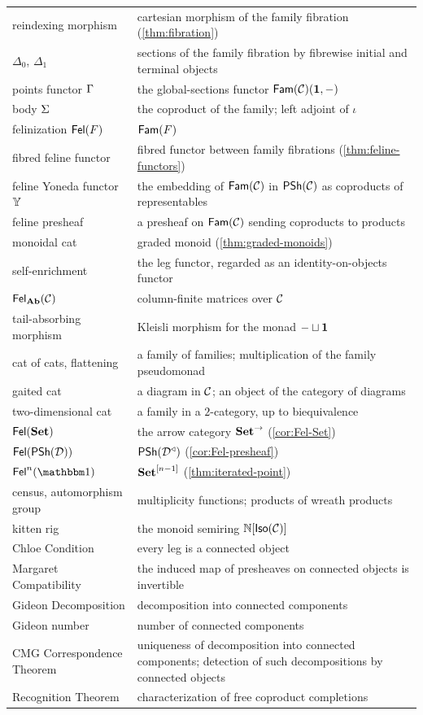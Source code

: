 {\begin{longtable}{p{}p{}}
reindexing morphism & cartesian morphism of the family fibration (\cref{thm:fibration})\\
$\Delta_0$, $\Delta_1$ & sections of the family fibration by fibrewise initial and terminal objects\\
points functor $\Gamma$ & the global-sections functor $\mathsf{Fam}(\mathcal{C})(\mathbf{1},-)$\\
body $\Sigma$ & the coproduct of the family; left adjoint of $\iota$\\
felinization $\mathsf{Fel}(F)$ & $\mathsf{Fam}(F)$\\
fibred feline functor & fibred functor between family fibrations (\cref{thm:feline-functors})\\
feline Yoneda functor $\mathbb{Y}$ & the embedding of $\mathsf{Fam}(\mathcal{C})$ in $\mathsf{PSh}(\mathcal{C})$ as coproducts of representables\\
feline presheaf & a presheaf on $\mathsf{Fam}(\mathcal{C})$ sending coproducts to products\\
monoidal cat & graded monoid (\cref{thm:graded-monoids})\\
self-enrichment & the leg functor, regarded as an identity-on-objects functor\\
$\mathsf{Fel}_{\mathbf{Ab}}(\mathcal{C})$ & column-finite matrices over $\mathcal{C}$\\
tail-absorbing morphism & Kleisli morphism for the monad $-\sqcup\mathbf{1}$\\
cat of cats, flattening & a family of families; multiplication of the family pseudomonad\\
gaited cat & a diagram in $\mathcal{C}$; an object of the category of diagrams\\
two-dimensional cat & a family in a $2$-category, up to biequivalence\\
$\mathsf{Fel}(\mathbf{Set})$ & the arrow category $\mathbf{Set}^{\to}$ (\cref{cor:Fel-Set})\\
$\mathsf{Fel}(\mathsf{PSh}(\mathcal{D}))$ & $\mathsf{PSh}(\mathcal{D}^{\triangleleft})$ (\cref{cor:Fel-presheaf})\\
$\Fel^n(\one)$ & $\mathbf{Set}^{[n-1]}$ (\cref{thm:iterated-point})\\
census, automorphism group & multiplicity functions; products of wreath products\\
kitten rig & the monoid semiring $\mathbb N[\mathsf{Iso}(\mathcal{C})]$\\
Chloe Condition & every leg is a connected object\\
Margaret Compatibility & the induced map of presheaves on connected objects is invertible\\
Gideon Decomposition & decomposition into connected components\\
Gideon number & number of connected components\\
CMG Correspondence Theorem & uniqueness of decomposition into connected components; detection of such decompositions by connected objects\\
Recognition Theorem & characterization of free coproduct completions\\
\end{longtable}
}
